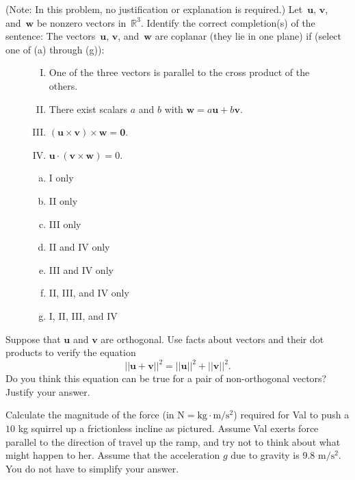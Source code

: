 \documentclass[11pt]{exam}
\newcommand{\R}{\mathbb{R}}
\begin{document}
\begin{questions}
\question[8] (Note: In this problem, no justification or explanation is required.) Let~$\mathbf{u}$, $\mathbf{v}$, and~$\mathbf{w}$ be nonzero vectors in~$\R^3$. Identify the correct completion(s) of the sentence: The vectors~$\mathbf{u}$, $\mathbf{v}$, and~$\mathbf{w}$ are coplanar (they lie in one plane) if (select one of (a) through (g)):
\begin{figure}[ht]
\hspace{2cm}
\begin{minipage}[t]{0.55\linewidth}
\begin{enumerate}[I.]
    \item One of the three vectors is parallel to the cross product of the others.
    \item There exist scalars $a$ and $b$ with $\mathbf{w} = a \mathbf{u} + b \mathbf{v}$.
    \item $(\mathbf{u} \times \mathbf{v}) \times \mathbf{w} = \mathbf{0}$.
    \item $\mathbf{u} \cdot (\mathbf{v} \times \mathbf{w}) = 0$.
\end{enumerate}
\end{minipage}
\hspace{0.5cm}
\begin{minipage}[t]{0.35\linewidth}
\begin{enumerate}[a.]
    \item I only
    \item II only
    \item III only
    \item II and IV only
    \item III and IV only
    \item II, III, and IV only
    \item I, II, III, and IV
\end{enumerate}
\end{minipage}
\end{figure}
\question[12] Suppose that $\mathbf{u}$ and $\mathbf{v}$ are orthogonal. Use facts about vectors and their dot products to verify the equation
\[
     ||\mathbf{u} + \mathbf{v}||^2 = ||\mathbf{u}||^2 + ||\mathbf{v}||^2.
 \] 
Do you think this equation can be true for a pair of non-orthogonal vectors? Justify your answer.


\newpage

\question[12] Calculate the magnitude of the force (in $\mathrm{N} = \mathrm{kg}\cdot\mathrm{m}/\mathrm{s}^2$) required for Val to push a $10$ kg squirrel up a frictionless incline as pictured. Assume Val exerts force parallel to the direction of travel up the ramp, and try not to think about what might happen to her. Assume that the acceleration $g$ due to gravity is 9.8 $\mathrm{m}/\mathrm{s}^2$. You do not have to simplify your answer.


\end{questions}
\end{document}
